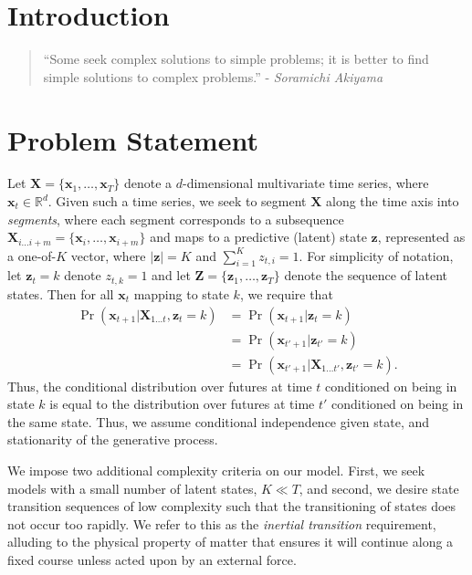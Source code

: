 \documentclass[12pt]{article}
\newenvironment{dedication}
        {\vspace{0.0ex}\begin{quotation}\begin{center}\begin{em}}
        {\par\end{em}\end{center}\end{quotation}}
\begin{document}
\section{Introduction}
\begin{dedication} ``Some seek complex solutions to simple problems; it is better to find simple solutions to complex problems.'' - \emph{Soramichi Akiyama}
\end{dedication}



\section{Problem Statement}

Let $\mathbf{X} = \{\mathbf{x}_1, \ldots, \mathbf{x}_T\}$ denote a $d$-dimensional multivariate time series, where $\mathbf{x}_t \in \mathbb{R}^d$. Given such a time series, we seek to segment $\mathbf{X}$ along the time axis into \emph{segments}, where each segment corresponds to a subsequence $\mathbf{X}_{i\ldots i+m} = \{\mathbf{x}_i, \ldots, \mathbf{x}_{i+m}\}$ and maps to a predictive (latent) state $\mathbf{z}$, represented as a one-of-$K$ vector, where $|\mathbf{z}| = K$ and $\sum_{i=1}^{K}z_{t,i} = 1$. For simplicity of notation, let $\mathbf{z}_{t} = k$ denote $z_{t,k} = 1$ and let $\mathbf{Z} = \{\mathbf{z}_1, \ldots, \mathbf{z}_T\}$ denote the sequence of latent states. Then for all $\mathbf{x}_{t}$ mapping to state $k$, we require that
\begin{align*}
    \Pr(\mathbf{x}_{t+1}|\mathbf{X}_{1\ldots t}, \mathbf{z}_t = k) &= \Pr(\mathbf{x}_{t+1}| \mathbf{z}_t = k) \\
                                                                   &= \Pr(\mathbf{x}_{t'+1}| \mathbf{z}_{t'} = k) \\
                                                                   &= \Pr(\mathbf{x}_{t'+1}| \mathbf{X}_{1\ldots t'}, \mathbf{z}_{t'} = k).
\end{align*}
Thus, the conditional distribution over futures at time $t$ conditioned on being in state $k$ is equal to the distribution over futures at time $t'$ conditioned on being in the same state. Thus, we assume conditional independence given state, and stationarity of the generative process.

We impose two additional complexity criteria on our model. First, we seek models with a small number of latent states, $K \ll T$, and second, we desire state transition sequences of low complexity such that the transitioning of states does not occur too rapidly. We refer to this as the \emph{inertial transition} requirement, alluding to the physical property of matter that ensures it will continue along a fixed course unless acted upon by an external force. 
\end{document}
